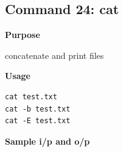 \subsection{Command 24: cat} 
\textbf{Purpose}
\begin{flushleft}
 concatenate and print files
\end{flushleft}
\textbf{Usage}
\begin{verbatim}
cat test.txt
cat -b test.txt
cat -E test.txt
\end{verbatim}
\textbf{Sample i/p and o/p}
\begin{figure}[H] 
\end{figure}
